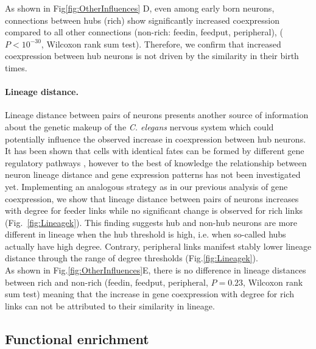 \documentclass[10pt,letterpaper]{article}
\begin{document}
As shown in Fig\ref{fig:OtherInfluences} D, even among early born neurons, connections between hubs (rich) show significantly increased coexpression compared to all other connections (non-rich: feedin, feedput, peripheral), ($P < 10^{-30}$, Wilcoxon rank sum test). 
Therefore, we confirm that increased coexpression between hub neurons is not driven by the similarity in their birth times. 


\paragraph{Lineage distance.}
Lineage distance between pairs of neurons presents another source of information about the genetic makeup of the \textit{C. elegans} nervous system which could potentially influence the observed increase in coexpression between hub neurons. 
It has been shown that cells with identical fates can be formed by different gene regulatory pathways \cite{Liu2009}, however to the best of knowledge the relationship between neuron lineage distance and gene expression patterns has not been investigated yet.
Implementing an analogous strategy as in our previous analysis of gene coexpression, we show that lineage distance between pairs of neurons increases with degree for feeder links while no significant change is observed for rich links (Fig.~\ref{fig:Lineagek}).
This finding suggests hub and non-hub neurons are more different in lineage when the hub threshold is high, i.e. when so-called hubs actually have high degree. 
Contrary, peripheral links manifest stably lower lineage distance through the range of degree thresholds (Fig.\ref{fig:Lineagek}).\\
As shown in Fig.\ref{fig:OtherInfluences}E, there is no difference in lineage distances between rich and non-rich (feedin, feedput, peripheral, $P = 0.23$, Wilcoxon rank sum test) meaning that the increase in gene coexpression with degree for rich links can not be attributed to their similarity in lineage.

\subsection*{Functional enrichment}

\end{document}
